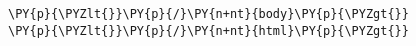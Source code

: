\begin{Verbatim}[commandchars=\\\{\}]
\PY{p}{\PYZlt{}}\PY{p}{/}\PY{n+nt}{body}\PY{p}{\PYZgt{}}
\PY{p}{\PYZlt{}}\PY{p}{/}\PY{n+nt}{html}\PY{p}{\PYZgt{}}
\end{Verbatim}
